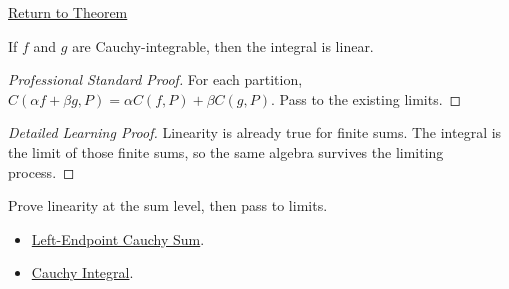 \newpage
{}
\label{prf:cauchy-integral-linearity}
\begin{remark*}[Return]\hyperref[thm:cauchy-integral-linearity]{Return to Theorem}\end{remark*}
\begin{theorem*}
If \(f\) and \(g\) are Cauchy-integrable, then the integral is linear.
\end{theorem*}
\begin{proof}[Professional Standard Proof]
\LRAProofBodyStart
For each partition, \(C(\alpha f+\beta g,P)=\alpha C(f,P)+\beta C(g,P)\).
Pass to the existing limits.
\end{proof}
\begin{proof}[Detailed Learning Proof]
\LRAProofBodyStart
Linearity is already true for finite sums. The integral is the limit of those
finite sums, so the same algebra survives the limiting process.
\end{proof}
\begin{remark*}
Prove linearity at the sum level, then pass to limits.
\end{remark*}
\begin{dependencies}
\begin{itemize}
  \item \hyperref[def:cauchy-sum]{Left-Endpoint Cauchy Sum}.
  \item \hyperref[def:cauchy-integral]{Cauchy Integral}.
\end{itemize}
\end{dependencies}
\clearpage
